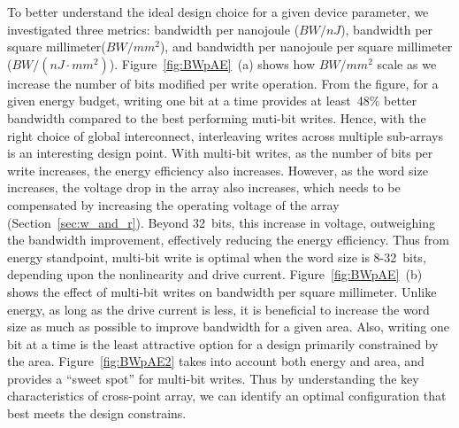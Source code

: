 To better understand the ideal design choice for a given device parameter,
we investigated three metrics: bandwidth per
nanojoule ($BW/nJ$), bandwidth per square millimeter($BW/mm^2$), and
bandwidth per nanojoule per square millimeter ($BW/(nJ\cdot mm^2)$).
Figure~\ref{fig:BWpAE}~(a) shows how $BW/mm^2$ scale as we increase the
number of bits modified per write operation. From the figure, for a given
energy budget, writing one bit at a time provides at least~48\% better bandwidth
compared to the best performing muti-bit writes. Hence, with the right choice
of global interconnect, interleaving writes across multiple sub-arrays is
an interesting design point.
With multi-bit writes, as the number of bits per write increases, the energy
efficiency also increases. However, as the word size increases, the voltage
drop in the array also increases, which needs to be compensated by increasing
the operating voltage of the array (Section~\ref{sec:w_and_r}). Beyond 32~bits, this
increase in voltage, outweighing the bandwidth improvement, effectively reducing
the energy efficiency.
Thus from energy standpoint, multi-bit write is optimal when the word size is
8-32~bits, depending upon the nonlinearity and drive current.
Figure~\ref{fig:BWpAE}~(b) shows the effect of multi-bit writes on bandwidth per
square millimeter. Unlike energy, as long as the drive current is less,
it is beneficial to increase the word size as much as possible to improve
bandwidth for a given area. Also, writing one bit at a time is the least
attractive option for a design primarily constrained by the area.
Figure~\ref{fig:BWpAE2} takes into account both energy and area, and
provides a ``sweet spot'' for multi-bit writes.
Thus by understanding the key characteristics of cross-point array, we can
identify an optimal configuration that best meets the design constrains.

